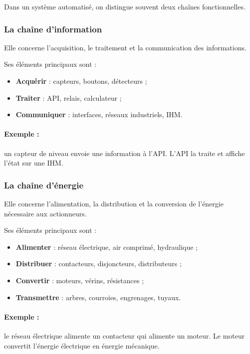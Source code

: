 Dans un système automatisé, on distingue souvent deux chaînes fonctionnelles.

\subsubsection{La chaîne d'information}

Elle concerne l'acquisition, le traitement et la communication des informations.

Ses éléments principaux sont :

\begin{itemize}
    \item \textbf{Acquérir} : capteurs, boutons, détecteurs ;
    \item \textbf{Traiter} : API, relais, calculateur ;
    \item \textbf{Communiquer} : interfaces, réseaux industriels, IHM.
\end{itemize}

\paragraph{Exemple :} un capteur de niveau envoie une information à l'API. L'API la traite et affiche l'état sur une IHM.

\subsubsection{La chaîne d'énergie}

Elle concerne l'alimentation, la distribution et la conversion de l'énergie nécessaire aux actionneurs.

Ses éléments principaux sont :

\begin{itemize}
    \item \textbf{Alimenter} : réseau électrique, air comprimé, hydraulique ;
    \item \textbf{Distribuer} : contacteurs, disjoncteurs, distributeurs ;
    \item \textbf{Convertir} : moteurs, vérins, résistances ;
    \item \textbf{Transmettre} : arbres, courroies, engrenages, tuyaux.
\end{itemize}

\paragraph{Exemple :} le réseau électrique alimente un contacteur qui alimente un moteur. Le moteur convertit l'énergie électrique en énergie mécanique.


